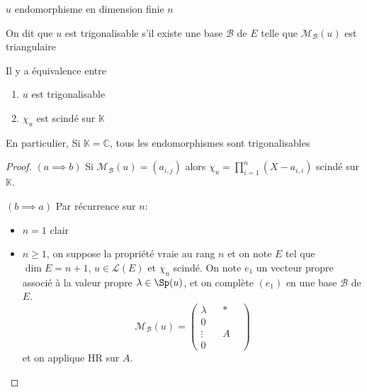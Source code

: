 \begin{thmdef}
    \Hyp $u$ endomorphisme en dimension finie $n$
    \begin{concenum}
    \item On dit que $u$ est trigonalisable s'il existe une base $\mathcal B$ de $E$ telle que $\mathcal M_{\mathcal B}(u)$ est triangulaire
    \item Il y a équivalence entre \begin{enumerate}
        \item $u$ est trigonalisable
        \item $\chi_u$ est scindé sur $\mathbb K$
    \end{enumerate}
    En particulier, Si $\mathbb K=\mathbb C$, tous les endomorphismes sont trigonalisables
    \end{concenum}
\end{thmdef}

\begin{proof}
    $(a\implies b)$ Si $\mathcal M_{\mathcal B}(u)=(a_{i, j})$ alors $\chi_u=\displaystyle\prod_{i=1}^n(X-a_{i,i})$ scindé sur $\mathbb K$.

    $(b\implies a)$ Par récurrence sur $n$: \begin{itemize}
        \item $n=1$ clair
        \item $n\geq 1$, on suppose la propriété vraie au rang $n$ et on note $E$ tel que $\dim E=n+1$, $u\in\mathcal L(E)$ et $\chi_u$ scindé. On note $e_1$ un vecteur propre associé à la valeur propre $\lambda\in\Sp(u)$, et on complète $(e_1)$ en une base $\mathcal B$ de $E$. \[
                \mathcal M_{\mathcal B}(u)= \left( \begin{array}{c|ccc}
                     \lambda & & * & \\
                    \hline 0 &&&\\
                    \vdots &&A&\\
                    0&&&
                \end{array}\right)
            \]
            et on applique HR sur $A$.
    \end{itemize}
\end{proof}

